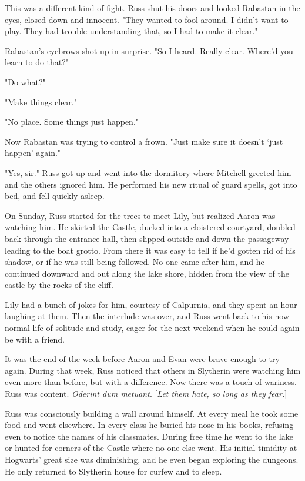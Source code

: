 This was a different kind of fight. Russ shut his doors and looked Rabastan in the eyes, closed down and innocent. "They wanted to fool around. I didn't want to play. They had trouble understanding that, so I had to make it clear."

Rabastan's eyebrows shot up in surprise. "So I heard. Really clear. Where'd you learn to do that?"

"Do what?"

"Make things clear."

"No place. Some things just happen."

Now Rabastan was trying to control a frown. "Just make sure it doesn't `just happen' again."

"Yes, sir." Russ got up and went into the dormitory where Mitchell greeted him and the others ignored him. He performed his new ritual of guard spells, got into bed, and fell quickly asleep.

On Sunday, Russ started for the trees to meet Lily, but realized Aaron was watching him. He skirted the Castle, ducked into a cloistered courtyard, doubled back through the entrance hall, then slipped outside and down the passageway leading to the boat grotto. From there it was easy to tell if he'd gotten rid of his shadow, or if he was still being followed. No one came after him, and he continued downward and out along the lake shore, hidden from the view of the castle by the rocks of the cliff.

Lily had a bunch of jokes for him, courtesy of Calpurnia, and they spent an hour laughing at them. Then the interlude was over, and Russ went back to his now normal life of solitude and study, eager for the next weekend when he could again be with a friend.

It was the end of the week before Aaron and Evan were brave enough to try again. During that week, Russ noticed that others in Slytherin were watching him even more than before, but with a difference. Now there was a touch of wariness. Russ was content. \emph{Oderint dum metuant}. [\emph{Let them hate, so long as they fear.}]

Russ was consciously building a wall around himself. At every meal he took some food and went elsewhere. In every class he buried his nose in his books, refusing even to notice the names of his classmates. During free time he went to the lake or hunted for corners of the Castle where no one else went. His initial timidity at Hogwarts' great size was diminishing, and he even began exploring the dungeons. He only returned to Slytherin house for curfew and to sleep.

